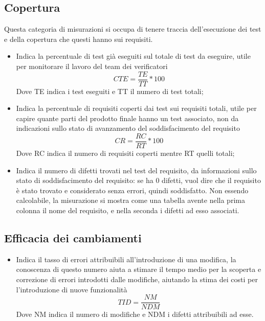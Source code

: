 \documentclass[PianoDiProgetto.tex]{subfiles}
\begin{document}
\subsection{Copertura}
Questa categoria di misurazioni si occupa di tenere traccia dell'esecuzione dei test e della copertura che questi hanno sui requisiti.
\begin{itemize}
	\item {} Indica la percentuale di test già eseguiti sul totale di test da eseguire, utile per monitorare il lavoro del team dei verificatori
	\[CTE=\dfrac{TE}{TT}*100\]
	Dove TE indica i test eseguiti e TT il numero di test totali;
	\item {} Indica la percentuale di requisiti coperti dai test sui requisiti totali, utile per capire quante parti del prodotto finale hanno un test associato, non da indicazioni sullo stato di avanzamento del soddisfacimento del requisito
	\[CR=\dfrac{RC}{RT}*100\]
	Dove RC indica il numero di requisiti coperti mentre RT quelli totali;
	\item {} Indica il numero di difetti trovati nel test del requisito, da informazioni sullo stato di soddisfacimento del requisito: se ha 0 difetti, vuol dire che il requisito è stato trovato e considerato senza errori, quindi soddisfatto.
	Non essendo calcolabile, la misurazione si mostra come una tabella avente nella prima colonna il nome del requisito, e nella seconda i difetti ad esso associati.
\end{itemize}
\subsection{Efficacia dei cambiamenti}
\begin{itemize}
	\item {} Indica il tasso di errori attribuibili all'introduzione di una modifica, la conoscenza di questo numero aiuta a stimare il tempo medio per la scoperta e correzione di errori introdotti dalle modifiche, aiutando la stima dei costi per l'introduzione di nuove funzionalità
	\[TID=\dfrac{NM}{NDM}\]
	Dove NM indica il numero di modifiche e NDM i difetti attribuibili ad esse.
\end{itemize}
\end{document}
